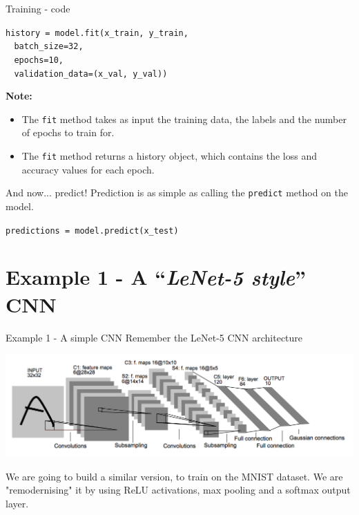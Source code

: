 \documentclass[9pt, aspectratio=169]{beamer}
\begin{document}
\begin{frame}
    {Training - code}
    \begin{codebox}
        \texttt{history = model.fit(x\_train, y\_train,\\
            $~~~~$batch\_size=32,\\
            $~~~~$epochs=10,\\
            $~~~~$validation\_data=(x\_val, y\_val))}
    \end{codebox}

    \normalsize
    \textbf{Note:}
    \begin{itemize}
        \item The \texttt{fit} method takes as input the training data, the labels and the number of epochs to train for.
        \item The \texttt{fit} method returns a history object, which contains the loss and accuracy values for each epoch.
    \end{itemize}
\end{frame}

\begin{frame}
    {And now... predict!}
    Prediction is as simple as calling the \texttt{predict} method on the model.

    \begin{codebox}
        \texttt{predictions = model.predict(x\_test)}
    \end{codebox}
\end{frame}

\section{Example 1 - A ``\textit{LeNet-5 style}'' CNN}

\begin{frame}
    {Example 1 - A simple CNN}
    Remember the LeNet-5 CNN architecture

    \centering
    \includegraphics[width=\textwidth]{lenet5.png}

    We are going to build a similar version, to train on the MNIST dataset. We are "remodernising" it by using ReLU activations, max pooling and a softmax output layer.
\end{frame}
\end{document}
